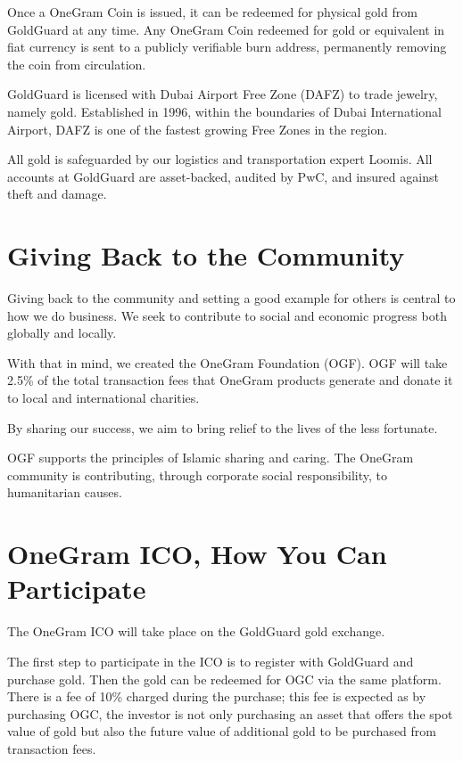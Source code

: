\documentclass[letterpaper,11pt]{article}
\begin{document}
Once a OneGram Coin is issued, it can be redeemed for physical gold from GoldGuard at any time. Any OneGram Coin redeemed for gold or equivalent in fiat currency is sent to a publicly verifiable burn address, permanently removing the coin from circulation.

GoldGuard is licensed with Dubai Airport Free Zone (DAFZ) to trade jewelry, namely gold. Established in 1996, within the boundaries of Dubai International Airport, DAFZ is one of the fastest growing Free Zones in the region.

All gold is safeguarded by our logistics and transportation expert Loomis. All accounts at GoldGuard are asset-backed, audited by PwC, and insured against theft and damage.


\section{Giving Back to the Community}

Giving back to the community and setting a good example for others is central to how we do business. We seek to contribute to social and economic progress both globally and locally.

With that in mind, we created the OneGram Foundation (OGF). OGF will take 2.5\% of the total transaction fees that OneGram products generate and donate it to local and international charities.

By sharing our success, we aim to bring relief to the lives of the less fortunate.

OGF supports the principles of Islamic sharing and caring. The OneGram community is contributing, through corporate social responsibility, to humanitarian causes.

\section{OneGram ICO, How You Can Participate}

The OneGram ICO will take place on the GoldGuard gold exchange.

The first step to participate in the ICO is to register with GoldGuard and purchase gold. Then the gold can be redeemed for OGC via the same platform. There is a fee of 10\% charged during the purchase; this fee is expected as by purchasing OGC, the investor is not only purchasing an asset that offers the spot value of gold but also the future value of additional gold to be purchased from transaction fees.
\end{document}
